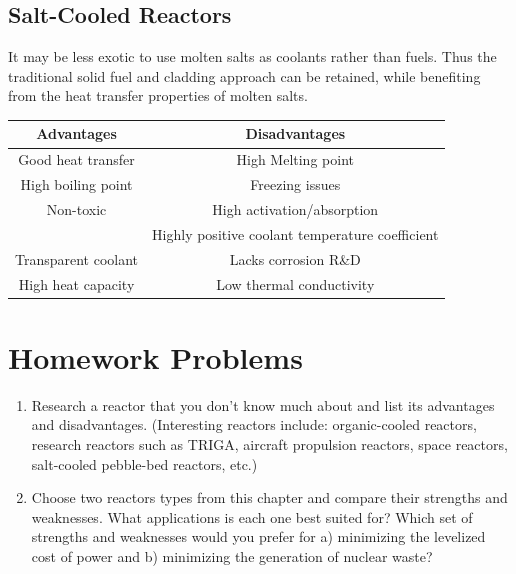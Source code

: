\subsection{Salt-Cooled Reactors}
It may be less exotic to use molten salts as coolants rather than fuels. Thus the traditional solid fuel and cladding approach can be retained, while benefiting from the heat transfer properties of molten salts.
\begin{table}[!ht]
\begin{tabular}{c|c}
  Advantages & Disadvantages \\
  \hline
  Good heat transfer & High Melting point \\
  High boiling point & Freezing issues\\
  Non-toxic & High activation/absorption \\
  & Highly positive coolant temperature coefficient\\
  Transparent coolant & Lacks corrosion R\&D \\
  High heat capacity & Low thermal conductivity \\ 
\end{tabular}
\end{table}

\section{Homework Problems}
\begin{enumerate}
\item Research a reactor that you don't know much about and list its advantages and disadvantages. (Interesting reactors include: organic-cooled reactors, research reactors such as TRIGA, aircraft propulsion reactors, space reactors, salt-cooled pebble-bed reactors, etc.)
\item Choose two reactors types from this chapter and compare their strengths and weaknesses. What applications is each one best suited for? Which set of strengths and weaknesses would you prefer for a) minimizing the levelized cost of power and b) minimizing the generation of nuclear waste?
\end{enumerate}
